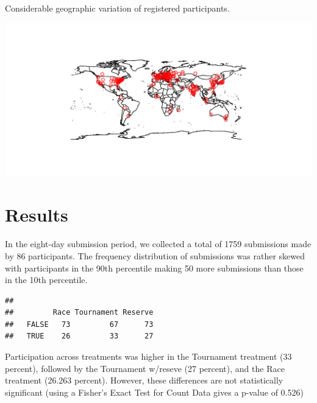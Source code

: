 \documentclass[12pt,]{article}
\begin{document}
Considerable geographic variation of registered participants.

\includegraphics{Figures/unnamed-chunk-9-1.pdf}

\clearpage

\section{Results}\label{results}

In the eight-day submission period, we collected a total of 1759
submissions made by 86 participants. The frequency distribution of
submissions was rather skewed with participants in the 90th percentile
making 50 more submissions than those in the 10th percentile.

\begin{verbatim}
##        
##         Race Tournament Reserve
##   FALSE   73         67      73
##   TRUE    26         33      27
\end{verbatim}

Participation across treatments was higher in the Tournament treatment
(33 percent), followed by the Tournament w/reseve (27 percent), and the
Race treatment (26.263 percent). However, these differences are not
statistically significant (using a Fisher's Exact Test for Count Data
gives a p-value of 0.526)
\end{document}
